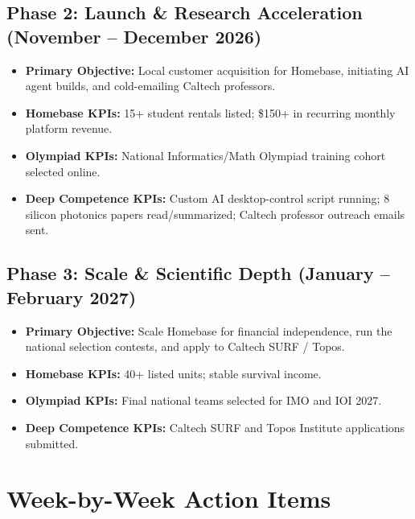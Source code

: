\documentclass[11pt,a4paper]{article}
\begin{document}
\subsection{Phase 2: Launch \& Research Acceleration (November -- December 2026)}
\begin{itemize}
    \item \textbf{Primary Objective:} Local customer acquisition for Homebase, initiating AI agent builds, and cold-emailing Caltech professors.
    \item \textbf{Homebase KPIs:} 15+ student rentals listed; \$150+ in recurring monthly platform revenue.
    \item \textbf{Olympiad KPIs:} National Informatics/Math Olympiad training cohort selected online.
    \item \textbf{Deep Competence KPIs:} Custom AI desktop-control script running; 8 silicon photonics papers read/summarized; Caltech professor outreach emails sent.
\end{itemize}

\subsection{Phase 3: Scale \& Scientific Depth (January -- February 2027)}
\begin{itemize}
    \item \textbf{Primary Objective:} Scale Homebase for financial independence, run the national selection contests, and apply to Caltech SURF / Topos.
    \item \textbf{Homebase KPIs:} 40+ listed units; stable survival income.
    \item \textbf{Olympiad KPIs:} Final national teams selected for IMO and IOI 2027.
    \item \textbf{Deep Competence KPIs:} Caltech SURF and Topos Institute applications submitted.
\end{itemize}

\newpage
\section{Week-by-Week Action Items}
\end{document}

